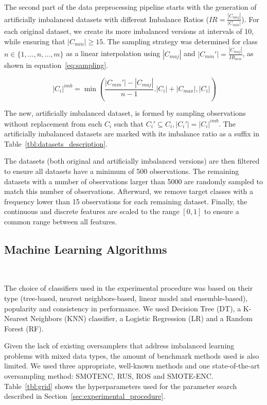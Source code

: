 \documentclass[preprint,12pt]{elsarticle}
\begin{document}
{

The second part of the data preprocessing pipeline starts with the generation
of artificially imbalanced datasets with different Imbalance Ratios
($IR=\frac{|C_{maj}|}{|C_{min}|}$). For each original dataset, we create its
more imbalanced versions at intervals of 10, while ensuring that $|C_{min}|
\ge 15$. The sampling strategy was determined for class $n \in
\{1,\ldots,n,\ldots,m\}$ as a linear interpolation using $|C_{maj}|$ and
$|C_{min}'|=\frac{|C_{maj}|}{IR_{new}}$, as shown in
equation~\ref{eq:sampling}.

\begin{equation}~\label{eq:sampling}
    |C_i|^{imb} =
    \min(\frac{|C_{min}'|-|C_{maj}|}{n-1}.|C_i|+|C_{max}|, |C_i|)
\end{equation}

The new, artificially imbalanced dataset, is formed by sampling observations
without replacement from each $C_i$ such that $C_i' \subseteq C_i , |C_i'| =
|C_i|^{imb}$. The artificially imbalanced datasets are marked with its
imbalance ratio as a suffix in Table~\ref{tbl:datasets_description}.

The datasets (both original and artificially imbalanced versions) are then
filtered to ensure all datasets have a minimum of 500 observations.  The
remaining datasets with a number of observations larger than 5000 are randomly
sampled to match this number of observations. Afterward, we remove target
classes with a frequency lower than 15 observations for each remaining
dataset. Finally, the continuous and discrete features are scaled to the
range $[0,1]$ to ensure a common range between all features. 

\subsection{Machine Learning Algorithms}~\label{sec:ml_algorithms}

The choice of classifiers used in the experimental procedure was based on
their type (tree-based, nearest neighbors-based, linear model and
ensemble-based), popularity and consistency in performance. We used Decision
Tree (DT), a K-Nearest Neighbors (KNN) classifier, a Logistic
Regression (LR) and a Random Forest (RF).

Given the lack of existing oversamplers that address imbalanced learning
problems with mixed data types, the amount of benchmark methods used is also
limited. We used three appropriate, well-known methods and one state-of-the-art
oversampling method: SMOTENC, RUS, ROS and SMOTE-ENC\@. Table~\ref{tbl:grid}
shows the hyperparameters used for the parameter search described in
Section~\ref{sec:experimental_procedure}.

}
\end{document}

